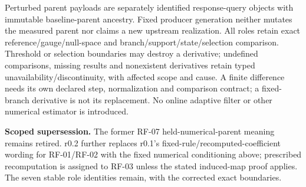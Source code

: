 {{Perturbed parent payloads are separately identified response-query objects
with immutable baseline-parent ancestry. Fixed producer generation neither
mutates the measured parent nor claims a new upstream realization. All roles
retain exact reference/gauge/null-space and branch/support/state/selection
comparison. Threshold or selection boundaries may destroy a derivative;
undefined comparisons, missing results and nonexistent derivatives retain
typed unavailability/discontinuity, with affected scope and cause. A finite
difference needs its own declared step, normalization and comparison contract;
a fixed-branch derivative is not its replacement. No online adaptive filter
or other numerical estimator is introduced.

\textbf{Scoped supersession.} The former RF-07 held-numerical-parent meaning
remains retired. r0.2 further replaces r0.1's fixed-rule/recomputed-coefficient
wording for RF-01/RF-02 with the fixed numerical conditioning above; prescribed
recomputation is assigned to RF-03 unless the stated induced-map proof applies.
The seven stable role identities remain, with the corrected exact boundaries.
}}
